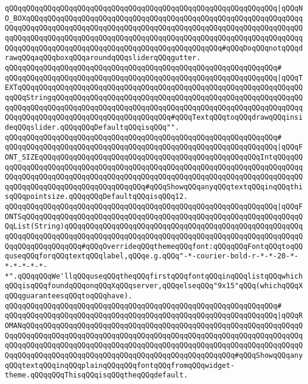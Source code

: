 \verb|qQQqqQQqqQQqqQQqqQQqqQQqqQQqqQQqqQQqqQQqqQQqqQQqqQQqqQQqqQQqqQQq|\verb#|qQQqNO_BOXqQQqqQQqqQQqqQQqqQQqqQQqqQQqqQQqqQQqqQQqqQQqqQQqqQQqqQQqqQQqqQQqqQQqqQQqqQQqqQQqqQQqqQQqqQQqqQQqqQQqqQQqqQQqqQQqqQQqqQQqqQQqqQQqqQQqqQQqqQQqqQQqqQQqqQQqqQQqqQQqqQQqqQQqqQQqqQQqqQQqqQQqqQQqqQQqqQQqqQQqqQQqqQQqqQQqqQQqqQQqqQQqqQQqqQQqqQQqqQQqqQQqqQQqqQQqqQQq#\verb|#qQQqDoqQQqnotqQQqdrawqQQqaqQQqboxqQQqaroundqQQqsliderqQQqgutter.|\newline
\verb|qQQqqQQqqQQqqQQqqQQqqQQqqQQqqQQqqQQqqQQqqQQqqQQqqQQqqQQqqQQqqQQq#|\newline
\verb|qQQqqQQqqQQqqQQqqQQqqQQqqQQqqQQqqQQqqQQqqQQqqQQqqQQqqQQqqQQqqQQq|\verb#|qQQqTEXTqQQqqQQqqQQqqQQqqQQqqQQqqQQqqQQqqQQqqQQqqQQqqQQqqQQqqQQqqQQqqQQqqQQqqQQqStringqQQqqQQqqQQqqQQqqQQqqQQqqQQqqQQqqQQqqQQqqQQqqQQqqQQqqQQqqQQqqQQqqQQqqQQqqQQqqQQqqQQqqQQqqQQqqQQqqQQqqQQqqQQqqQQqqQQqqQQqqQQqqQQqqQQqqQQqqQQqqQQqqQQqqQQqqQQqqQQqqQQqqQQq#\verb|#qQQqTextqQQqtoqQQqdrawqQQqinsideqQQqslider.qQQqqQQqDefaultqQQqisqQQq"".|\newline
\verb|qQQqqQQqqQQqqQQqqQQqqQQqqQQqqQQqqQQqqQQqqQQqqQQqqQQqqQQqqQQqqQQq#|\newline
\verb|qQQqqQQqqQQqqQQqqQQqqQQqqQQqqQQqqQQqqQQqqQQqqQQqqQQqqQQqqQQqqQQq|\verb#|qQQqFONT_SIZEqQQqqQQqqQQqqQQqqQQqqQQqqQQqqQQqqQQqqQQqqQQqqQQqqQQqIntqQQqqQQqqQQqqQQqqQQqqQQqqQQqqQQqqQQqqQQqqQQqqQQqqQQqqQQqqQQqqQQqqQQqqQQqqQQqqQQqqQQqqQQqqQQqqQQqqQQqqQQqqQQqqQQqqQQqqQQqqQQqqQQqqQQqqQQqqQQqqQQqqQQqqQQqqQQqqQQqqQQqqQQqqQQqqQQqqQQq#\verb|#qQQqShowqQQqanyqQQqtextqQQqinqQQqthisqQQqpointsize.qQQqqQQqDefaultqQQqisqQQq12.|\newline
\verb|qQQqqQQqqQQqqQQqqQQqqQQqqQQqqQQqqQQqqQQqqQQqqQQqqQQqqQQqqQQqqQQq|\verb#|qQQqFONTSqQQqqQQqqQQqqQQqqQQqqQQqqQQqqQQqqQQqqQQqqQQqqQQqqQQqqQQqqQQqqQQqqQQqList(String)qQQqqQQqqQQqqQQqqQQqqQQqqQQqqQQqqQQqqQQqqQQqqQQqqQQqqQQqqQQqqQQqqQQqqQQqqQQqqQQqqQQqqQQqqQQqqQQqqQQqqQQqqQQqqQQqqQQqqQQqqQQqqQQqqQQqqQQqqQQqqQQq#\verb|#qQQqOverrideqQQqthemeqQQqfont:qQQqqQQqFontqQQqtoqQQquseqQQqforqQQqtextqQQqlabel,qQQqe.g.qQQq"-*-courier-bold-r-*-*-20-*-*-*-*-*-*-*".qQQqqQQqWe'llqQQquseqQQqtheqQQqfirstqQQqfontqQQqinqQQqlistqQQqwhichqQQqisqQQqfoundqQQqonqQQqXqQQqserver,qQQqelseqQQq"9x15"qQQq(whichqQQqXqQQqguaranteesqQQqtoqQQqhave).|\newline
\verb|qQQqqQQqqQQqqQQqqQQqqQQqqQQqqQQqqQQqqQQqqQQqqQQqqQQqqQQqqQQqqQQq#|\newline
\verb|qQQqqQQqqQQqqQQqqQQqqQQqqQQqqQQqqQQqqQQqqQQqqQQqqQQqqQQqqQQqqQQq|\verb#|qQQqROMANqQQqqQQqqQQqqQQqqQQqqQQqqQQqqQQqqQQqqQQqqQQqqQQqqQQqqQQqqQQqqQQqqQQqqQQqqQQqqQQqqQQqqQQqqQQqqQQqqQQqqQQqqQQqqQQqqQQqqQQqqQQqqQQqqQQqqQQqqQQqqQQqqQQqqQQqqQQqqQQqqQQqqQQqqQQqqQQqqQQqqQQqqQQqqQQqqQQqqQQqqQQqqQQqqQQqqQQqqQQqqQQqqQQqqQQqqQQqqQQqqQQqqQQqqQQqqQQqqQQq#\verb|#qQQqShowqQQqanyqQQqtextqQQqinqQQqplainqQQqqQQqfontqQQqfromqQQqwidget-theme.qQQqqQQqThisqQQqisqQQqtheqQQqdefault.|\newline
